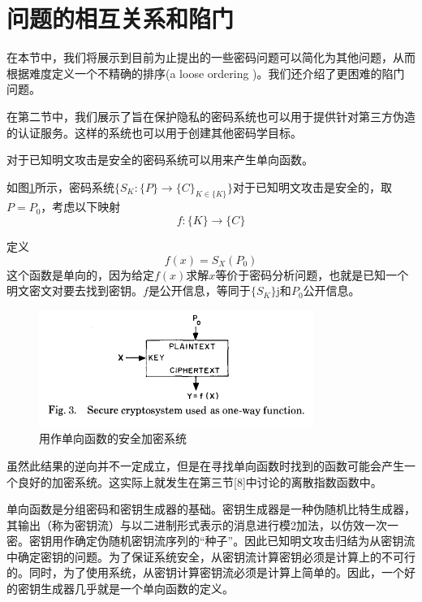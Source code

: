 \documentclass[]{article}
\begin{document}
	\section{问题的相互关系和陷门}
	
	在本节中，我们将展示到目前为止提出的一些密码问题可以简化为其他问题，从而根据难度定义一个不精确的排序(a loose ordering )。我们还介绍了更困难的陷门问题。
	
	在第二节中，我们展示了旨在保护隐私的密码系统也可以用于提供针对第三方伪造的认证服务。这样的系统也可以用于创建其他密码学目标。
	
	对于已知明文攻击是安全的密码系统可以用来产生单向函数。
	
	如图\ref{Fig:fig3}所示，密码系统$\{S_K:\{P\}\rightarrow \{C\}_{K\in \{K\}}\}$对于已知明文攻击是安全的，取$P=P_0$，考虑以下映射
	\begin{equation}
		f:\{K\}\rightarrow \{C\}
	\end{equation}

	定义
	\begin{equation}
		f(x)=S_X(P_0)
	\end{equation}
    这个函数是单向的，因为给定$f(x)$求解$x$等价于密码分析问题，也就是已知一个明文密文对要去找到密钥。$f$是公开信息，等同于$\{S_K\}$j和$P_0$公开信息。
	
	\begin{figure}[htbp]
		\centering
		\includegraphics[width=0.8\textwidth]{Fig3.png}
		\caption{用作单向函数的安全加密系统}
		\label{Fig:fig3}
	\end{figure}
	
	虽然此结果的逆向并不一定成立，但是在寻找单向函数时找到的函数可能会产生一个良好的加密系统。这实际上就发生在第三节[8]中讨论的离散指数函数中。
	
	单向函数是分组密码和密钥生成器的基础。密钥生成器是一种伪随机比特生成器，其输出（称为密钥流）与以二进制形式表示的消息进行模2加法，以仿效一次一密。密钥用作确定伪随机密钥流序列的“种子”。因此已知明文攻击归结为从密钥流中确定密钥的问题。为了保证系统安全，从密钥流计算密钥必须是计算上的不可行的。同时，为了使用系统，从密钥计算密钥流必须是计算上简单的。因此，一个好的密钥生成器几乎就是一个单向函数的定义。
	
\end{document}
